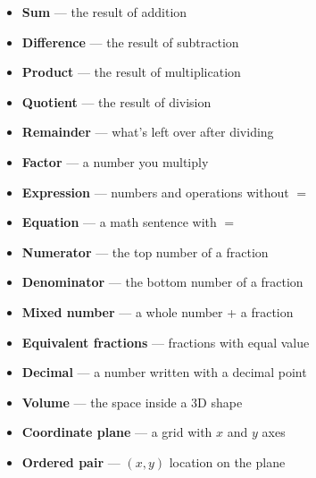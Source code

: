 {%
\begin{tcolorbox}[
    enhanced,
    colback=funTealLight,
    colframe=funTeal!50,
    arc=10pt,
    boxrule=1.5pt,
    left=5mm, right=5mm, top=4mm, bottom=4mm,
    title={\textcolor{white}{\faBook~Key Math Vocabulary}},
    colbacktitle=funTeal!70,
    fonttitle=\bfseries\sffamily,
]
    \small
    \begin{multicols}{2}
    \begin{itemize}[leftmargin=*, itemsep=2pt]
        \item \textbf{Sum} --- the result of addition
        \item \textbf{Difference} --- the result of subtraction
        \item \textbf{Product} --- the result of multiplication
        \item \textbf{Quotient} --- the result of division
        \item \textbf{Remainder} --- what's left over after dividing
        \item \textbf{Factor} --- a number you multiply
        \item \textbf{Expression} --- numbers and operations without $=$
        \item \textbf{Equation} --- a math sentence with $=$
        \item \textbf{Numerator} --- the top number of a fraction
        \item \textbf{Denominator} --- the bottom number of a fraction
        \item \textbf{Mixed number} --- a whole number + a fraction
        \item \textbf{Equivalent fractions} --- fractions with equal value
        \item \textbf{Decimal} --- a number written with a decimal point
        \item \textbf{Volume} --- the space inside a 3D shape
        \item \textbf{Coordinate plane} --- a grid with $x$ and $y$ axes
        \item \textbf{Ordered pair} --- $(x, y)$ location on the plane
    \end{itemize}
    \end{multicols}
\end{tcolorbox}

\vspace{1mm}

}
